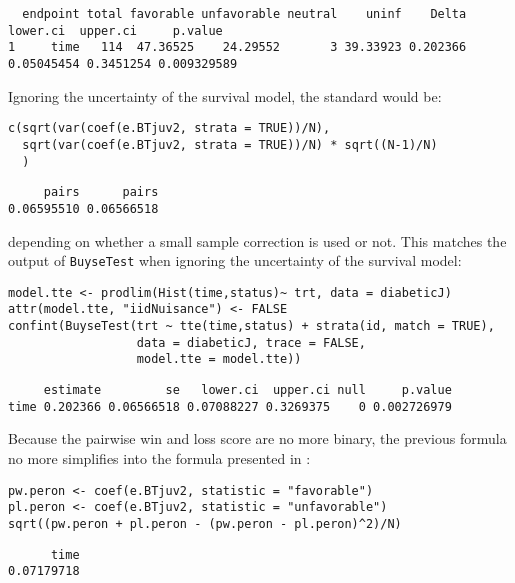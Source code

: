 \documentclass[12pt]{article}
\newcommand\Warning[1][3ex]{%
\renewcommand\stacktype{L}%
\scaleto{\stackon[1.3pt]{\color{red}$\triangle$}{\tiny\bfseries !}}{#1}%
\xspace
}
\begin{document}
\begin{verbatim}
  endpoint total favorable unfavorable neutral    uninf    Delta   lower.ci  upper.ci     p.value
1     time   114  47.36525    24.29552       3 39.33923 0.202366 0.05045454 0.3451254 0.009329589
\end{verbatim}


Ignoring the uncertainty of the survival model, the standard would be:
\lstset{language=r,label= ,caption= ,captionpos=b,numbers=none}
\begin{lstlisting}
c(sqrt(var(coef(e.BTjuv2, strata = TRUE))/N),
  sqrt(var(coef(e.BTjuv2, strata = TRUE))/N) * sqrt((N-1)/N)
  )
\end{lstlisting}

\begin{verbatim}
     pairs      pairs 
0.06595510 0.06566518
\end{verbatim}


depending on whether a small sample correction is used or not. This
matches the output of \texttt{BuyseTest} when ignoring the uncertainty of the
survival model:
\lstset{language=r,label= ,caption= ,captionpos=b,numbers=none}
\begin{lstlisting}
model.tte <- prodlim(Hist(time,status)~ trt, data = diabeticJ)
attr(model.tte, "iidNuisance") <- FALSE
confint(BuyseTest(trt ~ tte(time,status) + strata(id, match = TRUE), 
                  data = diabeticJ, trace = FALSE,
                  model.tte = model.tte))
\end{lstlisting}

\begin{verbatim}
     estimate         se   lower.ci  upper.ci null     p.value
time 0.202366 0.06566518 0.07088227 0.3269375    0 0.002726979
\end{verbatim}


\Warning Because the pairwise win and loss score are no more binary, the
previous formula no more simplifies into the formula presented in
\cite{matsouaka2022robust}:
\lstset{language=r,label= ,caption= ,captionpos=b,numbers=none}
\begin{lstlisting}
pw.peron <- coef(e.BTjuv2, statistic = "favorable")
pl.peron <- coef(e.BTjuv2, statistic = "unfavorable")
sqrt((pw.peron + pl.peron - (pw.peron - pl.peron)^2)/N)
\end{lstlisting}

\begin{verbatim}
      time 
0.07179718
\end{verbatim}
\end{document}
